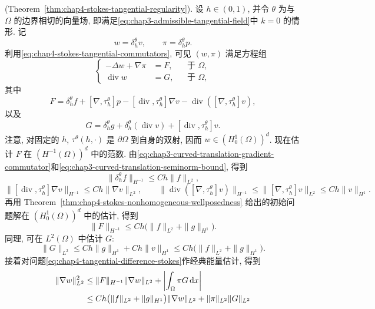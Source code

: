 \begin{Proof}
(Theorem~\ref{thm:chap4-stokes-tangential-regularity}).
设 $h\in(0,1)$, 并令 $\theta$ 为与 $\Omega$ 的边界相切的向量场, 即满足\eqref{eq:chap3-admissible-tangential-field}中 $k=0$ 的情形. 记
\[
 w=\delta_h^\theta v,\qquad\pi=\delta_h^\theta p.
\]
利用\eqref{eq:chap4-stokes-tangential-commutators}, 可见 $(w,\pi)$ 满足方程组
\begin{equation}
 \left\{
 \begin{aligned}
  -\Delta w+\nabla\pi&=F,&&\text{于 }\Omega,\\
  \operatorname{div}w&=G,&&\text{于 }\Omega,
 \end{aligned}
 \right.
 \label{eq:chap4-tangential-difference-stokes}
\end{equation}
其中
\begin{equation}
 F=\delta_h^\theta f+[\nabla,\tau_h^\theta]p
 -[\operatorname{div},\tau_h^\theta]\nabla v
 -\operatorname{div}([\nabla,\tau_h^\theta]v),
 \label{eq:chap4-tangential-difference-force}
\end{equation}
以及
\begin{equation}
 G=\delta_h^\theta g+\delta_h^\theta(\operatorname{div}v)
 +[\operatorname{div},\tau_h^\theta]v.
 \label{eq:chap4-tangential-difference-divergence}
\end{equation}
注意, 对固定的 $h$, $\tau^\theta(h,\cdot)$ 是 $\partial\Omega$ 到自身的双射, 因而 $w\in(H_0^1(\Omega))^d$. 现在估计 $F$ 在 $(H^{-1}(\Omega))^d$ 中的范数. 由\eqref{eq:chap3-curved-translation-gradient-commutator}和\eqref{eq:chap3-curved-translation-seminorm-bound}, 得到
\[
 \|\delta_h^\theta f\|_{H^{-1}}\leq Ch\|f\|_{L^2},
\]
\[
 \|[\operatorname{div},\tau_h^\theta]\nabla v\|_{H^{-1}}
 \leq Ch\|\nabla v\|_{L^2},
 \qquad
 \|\operatorname{div}([\nabla,\tau_h^\theta]v)\|_{H^{-1}}
 \leq\|[\nabla,\tau_h^\theta]v\|_{L^2}
 \leq Ch\|v\|_{H^1}.
\]
再用 Theorem~\ref{thm:chap4-stokes-nonhomogeneous-wellposedness} 给出的初始问题解在 $(H_0^1(\Omega))^d$ 中的估计, 得到
\[
 \|F\|_{H^{-1}}\leq Ch\bigl(\|f\|_{L^2}+\|g\|_{H^1}\bigr).
\]
同理, 可在 $L^2(\Omega)$ 中估计 $G$:
\[
 \|G\|_{L^2}\leq Ch\|g\|_{H^1}+Ch\|v\|_{H^1}
 \leq Ch\bigl(\|f\|_{L^2}+\|g\|_{H^1}\bigr).
\]
接着对问题\eqref{eq:chap4-tangential-difference-stokes}作经典能量估计, 得到
\begin{align}
 \|\nabla w\|_{L^2}^2
 &\leq\|F\|_{H^{-1}}\|\nabla w\|_{L^2}
 +\left|\int_\Omega\pi G\,\mathrm dx\right|\notag\\
 &\leq Ch\bigl(\|f\|_{L^2}+\|g\|_{H^1}\bigr)\|\nabla w\|_{L^2}
 +\|\pi\|_{L^2}\|G\|_{L^2}\notag\\

\end{align}
\end{Proof}
